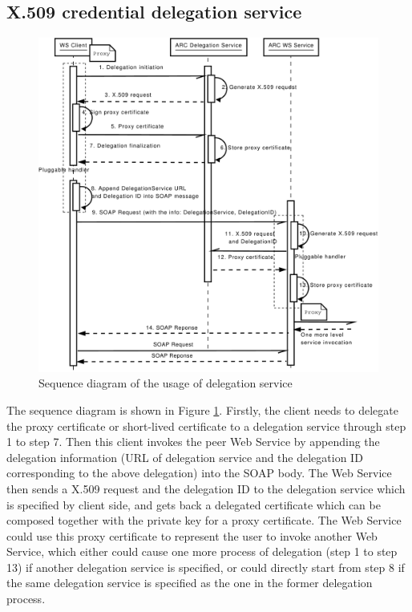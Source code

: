 \documentclass[conference]{IEEEtran}
\begin{document}
\subsection{X.509 credential delegation service}
\label{sec:creddeleg}

\begin{figure}
\includegraphics[width=1.0\columnwidth]{Delegation_UML.pdf}
\caption{Sequence diagram of the usage of delegation service}
\label{fig:DelegUML}
\end{figure}

The sequence diagram is shown in Figure \ref{fig:DelegUML}. Firstly, the client needs to delegate
the proxy certificate or short-lived certificate to a delegation service through step 1 to step 7.
Then this client invokes the peer Web Service by appending the delegation information (URL of delegation
service and the delegation ID corresponding to the above delegation) into the SOAP body. The Web 
Service then sends a X.509 request and the delegation ID to the delegation service 
which is specified by client side, and gets back a delegated certificate which can be composed together
with the private key for a proxy certificate. The Web Service could use this proxy certificate 
to represent the user to invoke another Web Service, which either could cause one more process of 
delegation (step 1 to step 13) if another delegation service is specified, or could directly start
from step 8 if the same delegation service is specified as the one in the former delegation process.
\end{document}
